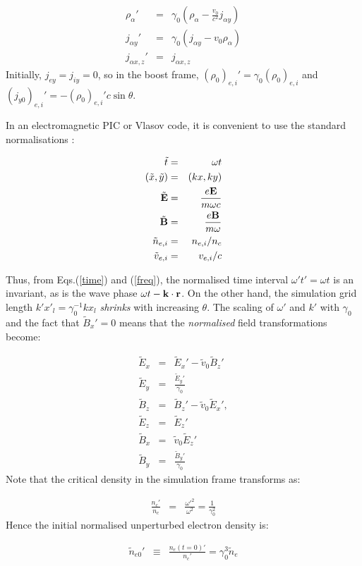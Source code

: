 \documentclass[11pt]{article}
\def\bea{\begin{eqnarray}}
\def\eea{\end{eqnarray}}
\begin{document}
\bea
\rho_\alpha' & = & \gamma_0(\rho_\alpha - \frac{v_0}{c^2}j_{\alpha y}) \nonumber \\
j_{\alpha y}' & = & \gamma_0(j_{\alpha y} - v_0\rho_\alpha) \nonumber\\
j_{\alpha x,z}' & = & j_{\alpha x,z} \nonumber
\eea
Initially, $j_{ey} = j_{iy} = 0$, so in the boost frame, $(\rho_0)_{e,i}' = \gamma_0(\rho_0)_{e,i}$ and $(j_{y0})_{e,i}' = -(\rho_0)_{e,i}'c\sin\theta$.

In an electromagnetic PIC or Vlasov code, it is convenient to use the standard normalisations \cite{birdsall:book}:

\bea
\tilde{t} & = & \omega t \nonumber \\
(\tilde{x},\tilde{y}) & = & (kx, ky) \nonumber \\
\tilde{{\bf E}} & = & \frac{e{\bf E}}{m\omega c} \nonumber \\
\tilde{{\bf B}} & = & \frac{e{\bf B}}{m\omega} \nonumber \\
\tilde{n}_{e,i} & = & n_{e,i}/n_c \nonumber \\
\tilde{v}_{e,i} & = & v_{e,i}/c \nonumber
\eea

Thus, from Eqs.(\ref{time}) and (\ref{freq}), the normalised time interval
$\omega 't' = \omega t$ is an invariant, as is the wave phase 
$\omega t - {\bf k}\cdot {\bf r}$.  On the other hand, the simulation
grid length $k'x'_l = \gamma_0^{-1}kx_l$ {\em shrinks} with increasing $\theta$.
The scaling of $\omega'$ and $k'$ with $\gamma_0$ and the fact that $\tilde{B}_x'=0$ means that the {\em
normalised} field transformations become:

\bea
\tilde{E}_x & = & \tilde{E}_x' - \tilde{v}_0\tilde{B}_z' \nonumber \\
\tilde{E}_y & = & \frac{\tilde{E}_y'}{\gamma_0} \nonumber \\
\tilde{B}_z & = & \tilde{B}_z' - \tilde{v}_0\tilde{E}_x', \nonumber\\
\tilde{E}_z & = & \tilde{E}_z'  \nonumber\\
\tilde{B}_x & = & \tilde{v}_0\tilde{E}_z' \nonumber \\
\tilde{B}_y & = & \frac{\tilde{B}_y'}{\gamma_0} \label{fields2} 
\eea
%
Note that the critical density in the simulation frame transforms as:

\bea 
\frac{n_c'}{n_c} & = & \frac{\omega '^2}{\omega^2} = \frac{1}{\gamma_0^2} \nonumber 
\eea
%
Hence the initial normalised unperturbed electron density is:

\bea
\tilde{n}_{e0}' & \equiv & \frac{n_e(t=0)'}{n_c'} = \gamma_0^3\tilde{n}_e \nonumber
\eea
\end{document}
